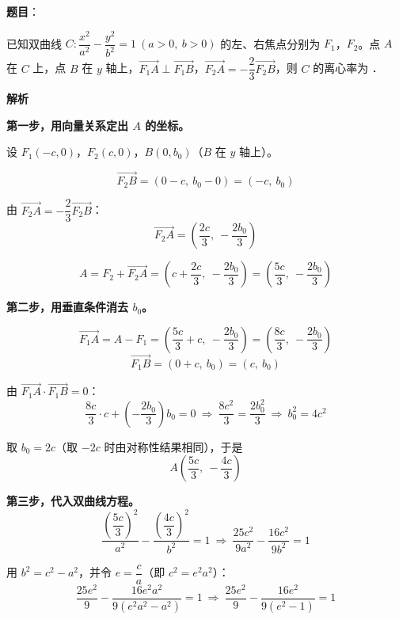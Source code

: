 \begin{answer}

\textbf{题目}：

已知双曲线 $C:\dfrac{x^{2}}{a^{2}}-\dfrac{y^{2}}{b^{2}}=1\ (a>0,\ b>0)$ 的左、右焦点分别为 $F_1$，$F_2$。点 $A$ 在 $C$ 上，点 $B$ 在 $y$ 轴上，$\overrightarrow{F_1A}\perp\overrightarrow{F_1B}$，$\overrightarrow{F_2A}=-\dfrac23\overrightarrow{F_2B}$，则 $C$ 的离心率为 \gkblank{}．

\textbf{解析}

\textbf{第一步，用向量关系定出 $A$ 的坐标。}

设 $F_1(-c,0)$，$F_2(c,0)$，$B\left(0,b_0\right)$（$B$ 在 $y$ 轴上）。

\nopagebreak[4]
\[\overrightarrow{F_2B}=(0-c,\ b_0-0)=\left(-c,\ b_0\right)\]

由 $\overrightarrow{F_2A}=-\dfrac23\overrightarrow{F_2B}$：
\nopagebreak[4]
\[\overrightarrow{F_2A}=\left(\frac{2c}3,\ -\frac{2b_0}3\right)\]

\nopagebreak[4]
\[A=F_2+\overrightarrow{F_2A}=\left(c+\frac{2c}3,\ -\frac{2b_0}3\right)=\left(\frac{5c}3,\ -\frac{2b_0}3\right)\]

\textbf{第二步，用垂直条件消去 $b_0$。}

\nopagebreak[4]
\[\overrightarrow{F_1A}=A-F_1=\left(\frac{5c}3+c,\ -\frac{2b_0}3\right)=\left(\frac{8c}3,\ -\frac{2b_0}3\right)\]
\nopagebreak[4]
\[\overrightarrow{F_1B}=\left(0+c,\ b_0\right)=\left(c,\ b_0\right)\]

由 $\overrightarrow{F_1A}\cdot\overrightarrow{F_1B}=0$：
\nopagebreak[4]
\[\frac{8c}3\cdot c+\left(-\frac{2b_0}3\right)b_0=0\ \Longrightarrow\ \frac{8c^{2}}3=\frac{2b_0^{2}}3\ \Longrightarrow\ b_0^{2}=4c^{2}\]

取 $b_0=2c$（取 $-2c$ 时由对称性结果相同），于是
\nopagebreak[4]
\[A\left(\frac{5c}3,\ -\frac{4c}3\right)\]

\textbf{第三步，代入双曲线方程。}
\nopagebreak[4]
\[\frac{\left(\dfrac{5c}3\right)^{2}}{a^{2}}-\frac{\left(\dfrac{4c}3\right)^{2}}{b^{2}}=1\ \Longrightarrow\ \frac{25c^{2}}{9a^{2}}-\frac{16c^{2}}{9b^{2}}=1\]

用 $b^{2}=c^{2}-a^{2}$，并令 $e=\dfrac ca$（即 $c^{2}=e^{2}a^{2}$）：
\nopagebreak[4]
\[\frac{25e^{2}}9-\frac{16e^{2}a^{2}}{9\left(e^{2}a^{2}-a^{2}\right)}=1\ \Longrightarrow\ \frac{25e^{2}}9-\frac{16e^{2}}{9\left(e^{2}-1\right)}=1\]


\end{answer}
